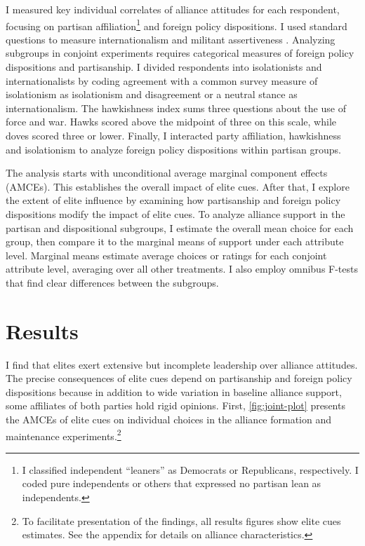 \documentclass[12pt]{article}
\begin{document}
I measured key individual correlates of alliance attitudes for each respondent, focusing on partisan affiliation\footnote{I classified independent ``leaners'' as Democrats or Republicans, respectively. I coded pure independents or others that expressed no partisan lean as independents.} and foreign policy dispositions. 
I used standard questions to measure internationalism and militant assertiveness \citep{KertzerBrutger2016}.
Analyzing subgroups in conjoint experiments requires categorical measures of foreign policy dispositions and partisanship. 
I divided respondents into isolationists and internationalists by coding agreement with a common survey measure of isolationism as isolationism and disagreement or a neutral stance as internationalism. 
The hawkishness index sums three questions about the use of force and war. 
Hawks scored above the midpoint of three on this scale, while doves scored three or lower. 
Finally, I interacted party affiliation, hawkishness and isolationism to analyze foreign policy dispositions within partisan groups.


The analysis starts with unconditional average marginal component effects (AMCEs).
This establishes the overall impact of elite cues. 
After that, I explore the extent of elite influence by examining how partisanship and foreign policy dispositions modify the impact of elite cues. 
To analyze alliance support in the partisan and dispositional subgroups, I estimate the overall mean choice for each group, then compare it to the marginal means of support under each attribute level.
Marginal means estimate average choices or ratings for each conjoint attribute level, averaging over all other treatments. 
I also employ omnibus F-tests \citep{Leeperetal2020} that find clear differences between the subgroups.  


\section{Results} 


I find that elites exert extensive but incomplete leadership over alliance attitudes.
The precise consequences of elite cues depend on partisanship and foreign policy dispositions because in addition to wide variation in baseline alliance support, some affiliates of both parties hold rigid opinions. 
First, \autoref{fig:joint-plot} presents the AMCEs of elite cues on individual choices in the alliance formation and maintenance experiments.\footnote{To facilitate presentation of the findings, all results figures show elite cues estimates. See the appendix for details on alliance characteristics.}
\end{document}
